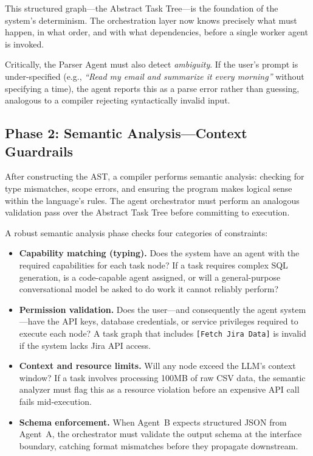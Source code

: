 \documentclass[sigconf,nonacm]{acmart}
\begin{document}
This structured graph---the Abstract Task Tree---is the foundation of
the system's determinism. The orchestration layer now knows precisely
what must happen, in what order, and with what dependencies, before a
single worker agent is invoked.

Critically, the Parser Agent must also detect \emph{ambiguity}. If the
user's prompt is under-specified (e.g., \emph{``Read my email and
summarize it every morning''} without specifying a time), the agent
reports this as a parse error rather than guessing, analogous to a
compiler rejecting syntactically invalid input.

\subsection{Phase 2: Semantic Analysis---Context Guardrails}
\label{sec:arch:validation}

After constructing the AST, a compiler performs semantic analysis:
checking for type mismatches, scope errors, and ensuring the program
makes logical sense within the language's rules. The agent orchestrator
must perform an analogous validation pass over the Abstract Task Tree
before committing to execution.

A robust semantic analysis phase checks four categories of constraints:

\begin{itemize}[leftmargin=*]
  \item \textbf{Capability matching (typing).} Does the system have an
        agent with the required capabilities for each task node? If a
        task requires complex SQL generation, is a code-capable agent
        assigned, or will a general-purpose conversational model be
        asked to do work it cannot reliably perform?
  \item \textbf{Permission validation.} Does the user---and consequently
        the agent system---have the API keys, database credentials, or
        service privileges required to execute each node? A task graph
        that includes \texttt{[Fetch Jira Data]} is invalid if the
        system lacks Jira API access.
  \item \textbf{Context and resource limits.} Will any node exceed the
        LLM's context window? If a task involves processing 100MB of
        raw CSV data, the semantic analyzer must flag this as a resource
        violation before an expensive API call fails mid-execution.
  \item \textbf{Schema enforcement.} When Agent~B expects structured
        JSON from Agent~A, the orchestrator must validate the output
        schema at the interface boundary, catching format mismatches
        before they propagate downstream.
\end{itemize}
\end{document}
